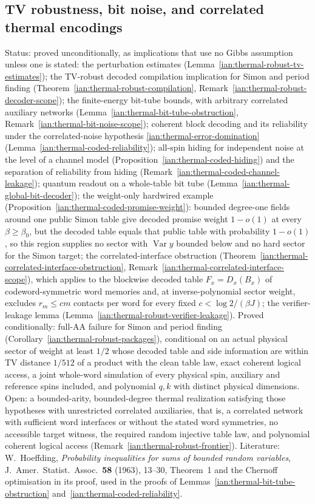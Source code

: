 \subsection{TV robustness, bit noise, and correlated thermal encodings}\label{ian:thermal-robust}
Status: proved unconditionally, as implications that use no Gibbs assumption unless one is stated: the perturbation estimates (Lemma~\ref{ian:thermal-robust-tv-estimates}); the TV-robust decoded compilation implication for Simon and period finding (Theorem~\ref{ian:thermal-robust-compilation}, Remark~\ref{ian:thermal-robust-decoder-scope}); the finite-energy bit-tube bounds, with arbitrary correlated auxiliary networks (Lemma~\ref{ian:thermal-bit-tube-obstruction}, Remark~\ref{ian:thermal-bit-noise-scope}); coherent block decoding and its reliability under the correlated-noise hypothesis \eqref{ian:thermal-error-domination} (Lemma~\ref{ian:thermal-coded-reliability}); all-spin hiding for independent noise at the level of a channel model (Proposition~\ref{ian:thermal-coded-hiding}) and the separation of reliability from hiding (Remark~\ref{ian:thermal-coded-channel-leakage}); quantum readout on a whole-table bit tube (Lemma~\ref{ian:thermal-global-bit-decoder}); the weight-only hardwired example (Proposition~\ref{ian:thermal-coded-promise-weight}): bounded degree-one fields around one public Simon table give decoded promise weight \(1-o(1)\) at every \(\beta\ge\beta_0\), but the decoded table equals that public table with probability \(1-o(1)\), so this region supplies no sector with \(\operatorname{Var}y\) bounded below and no hard sector for the Simon target; the correlated-interface obstruction (Theorem~\ref{ian:thermal-correlated-interface-obstruction}, Remark~\ref{ian:thermal-correlated-interface-scope}), which applies to the blockwise decoded table \(F_x=D_x(B_x)\) of codeword-symmetric word memories and, at inverse-polynomial sector weight, excludes \(r_m\le cm\) contacts per word for every fixed \(c<\log2/(\beta J)\); the verifier-leakage lemma (Lemma~\ref{ian:thermal-robust-verifier-leakage}). Proved conditionally: full-AA failure for Simon and period finding (Corollary~\ref{ian:thermal-robust-packages}), conditional on an actual physical sector of weight at least \(1/2\) whose decoded table and side information are within TV distance \(1/512\) of a product with the clean table law, exact coherent logical access, a joint whole-word simulation of every physical spin, auxiliary and reference spins included, and polynomial \(q,k\) with distinct physical dimensions. Open: a bounded-arity, bounded-degree thermal realization satisfying those hypotheses with unrestricted correlated auxiliaries, that is, a correlated network with sufficient word interfaces or without the stated word symmetries, no accessible target witness, the required random injective table law, and polynomial coherent logical access (Remark~\ref{ian:thermal-robust-frontier}). Literature: W.~Hoeffding, \emph{Probability inequalities for sums of bounded random variables}, J.~Amer.\ Statist.\ Assoc.\ \textbf{58} (1963), 13--30, Theorem~1 and the Chernoff optimisation in its proof, used in the proofs of Lemmas~\ref{ian:thermal-bit-tube-obstruction} and~\ref{ian:thermal-coded-reliability}.

